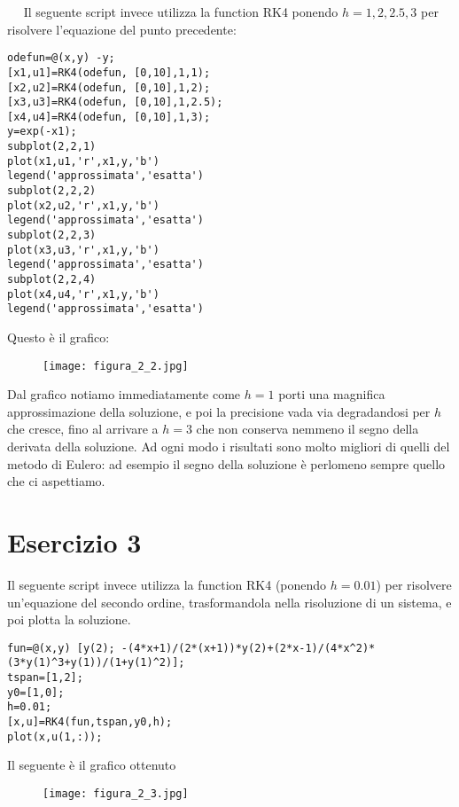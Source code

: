 \documentclass{article}
\begin{document}
\ \
\noindent
Il seguente script invece utilizza la function RK4 ponendo $h=1, 2, 2.5, 3$ per risolvere l'equazione del punto precedente:
\ \

\begin{lstlisting}[style=Matlab-editor]
odefun=@(x,y) -y;
[x1,u1]=RK4(odefun, [0,10],1,1);
[x2,u2]=RK4(odefun, [0,10],1,2);
[x3,u3]=RK4(odefun, [0,10],1,2.5);
[x4,u4]=RK4(odefun, [0,10],1,3);
y=exp(-x1);
subplot(2,2,1) 
plot(x1,u1,'r',x1,y,'b') 
legend('approssimata','esatta')
subplot(2,2,2) 
plot(x2,u2,'r',x1,y,'b')
legend('approssimata','esatta')
subplot(2,2,3) 
plot(x3,u3,'r',x1,y,'b')
legend('approssimata','esatta')
subplot(2,2,4) 
plot(x4,u4,'r',x1,y,'b')
legend('approssimata','esatta')
\end{lstlisting}

\newpage

Questo \`{e} il grafico:
\begin{figure}[h!t]
\texttt{[image: figura\_2\_2.jpg]}
\centering
\end{figure}

\noindent
Dal grafico notiamo immediatamente come $h=1$ porti una magnifica approssimazione della soluzione, e poi la precisione vada via degradandosi per $h$ che cresce, fino al arrivare a $h=3$ che non conserva nemmeno il segno della derivata della soluzione. Ad ogni modo i risultati sono molto migliori di quelli del metodo di Eulero: ad esempio il segno della soluzione è perlomeno sempre quello che ci aspettiamo.

\newpage

\section*{Esercizio 3}

Il seguente script invece utilizza la function RK4 (ponendo $h=0.01$) per risolvere un'equazione del secondo ordine, trasformandola nella risoluzione di un sistema, e poi plotta la soluzione.

\begin{lstlisting}[style=Matlab-editor]
fun=@(x,y) [y(2); -(4*x+1)/(2*(x+1))*y(2)+(2*x-1)/(4*x^2)*(3*y(1)^3+y(1))/(1+y(1)^2)];
tspan=[1,2];
y0=[1,0];
h=0.01;
[x,u]=RK4(fun,tspan,y0,h);
plot(x,u(1,:));
\end{lstlisting}

\noindent
Il seguente è il grafico ottenuto

\begin{figure}[h!t]
\texttt{[image: figura\_2\_3.jpg]}
\centering
\end{figure}
\end{document}
